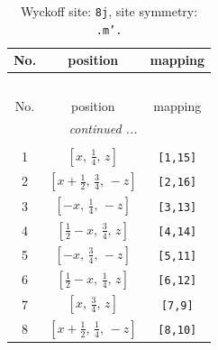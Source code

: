 \documentclass[fleqn,8pt]{jsarticle}
\begin{document}
\begin{longtable}{ccc}
\caption{Wyckoff site: {\tt 8j}, site symmetry: {\tt .m'.}}
 \\
 \hline \hline
No. & position & mapping \\ \hline \endfirsthead

\multicolumn{2}{l}{\tablename\ \thetable{}} \\
 \hline \hline
No. & position & mapping \\ \hline \endhead

 \hline \hline
\multicolumn{2}{r}{\footnotesize\it continued ...} \\ \endfoot

 \hline \hline
\multicolumn{2}{r}{} \\ \endlastfoot

1 & $\left[ x,\, \frac{1}{4},\, z \right]$ & {\tt [1,15]} \\ \hline
2 & $\left[ x + \frac{1}{2},\, \frac{3}{4},\, - z \right]$ & {\tt [2,16]} \\ \hline
3 & $\left[ - x,\, \frac{1}{4},\, - z \right]$ & {\tt [3,13]} \\ \hline
4 & $\left[ \frac{1}{2} - x,\, \frac{3}{4},\, z \right]$ & {\tt [4,14]} \\ \hline
5 & $\left[ - x,\, \frac{3}{4},\, - z \right]$ & {\tt [5,11]} \\ \hline
6 & $\left[ \frac{1}{2} - x,\, \frac{1}{4},\, z \right]$ & {\tt [6,12]} \\ \hline
7 & $\left[ x,\, \frac{3}{4},\, z \right]$ & {\tt [7,9]} \\ \hline
8 & $\left[ x + \frac{1}{2},\, \frac{1}{4},\, - z \right]$ & {\tt [8,10]} \\
\end{longtable}
\renewcommand{\arraystretch}{1.2}
\end{document}

